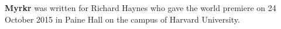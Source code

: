 \textbf{Myrkr} was written for Richard Haynes who gave the world premiere on 24
October 2015 in Paine Hall on the campus of Harvard University.
